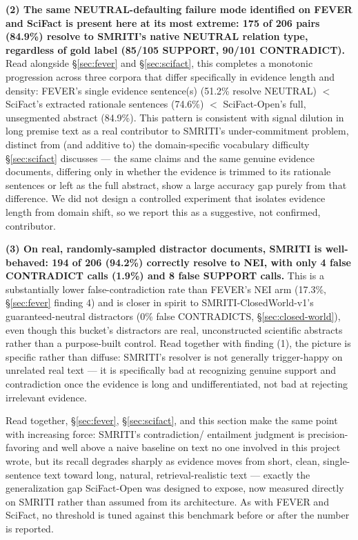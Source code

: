 \textbf{(2) The same NEUTRAL-defaulting failure mode identified on FEVER
and SciFact is present here at its most extreme: 175 of 206 pairs
(84.9\%) resolve to SMRITI's native NEUTRAL relation type, regardless of
gold label (85/105 SUPPORT, 90/101 CONTRADICT).} Read alongside
\S\ref{sec:fever} and \S\ref{sec:scifact}, this completes a monotonic
progression across three corpora that differ specifically in evidence
length and density: FEVER's single evidence sentence(s) (51.2\% resolve
NEUTRAL) $<$ SciFact's extracted rationale sentences (74.6\%) $<$
SciFact-Open's full, unsegmented abstract (84.9\%). This pattern is
consistent with signal dilution in long premise text as a real
contributor to SMRITI's under-commitment problem, distinct from (and
additive to) the domain-specific vocabulary difficulty \S\ref{sec:scifact}
discusses --- the same claims and the same genuine evidence documents,
differing only in whether the evidence is trimmed to its rationale
sentences or left as the full abstract, show a large accuracy gap
purely from that difference. We did not design a controlled experiment
that isolates evidence length from domain shift, so we report this as a
suggestive, not confirmed, contributor.

\textbf{(3) On real, randomly-sampled distractor documents, SMRITI is
well-behaved: 194 of 206 (94.2\%) correctly resolve to NEI, with only 4
false CONTRADICT calls (1.9\%) and 8 false SUPPORT calls.} This is a
substantially lower false-contradiction rate than FEVER's NEI arm
(17.3\%, \S\ref{sec:fever} finding 4) and is closer in spirit to
SMRITI-ClosedWorld-v1's guaranteed-neutral distractors (0\% false
CONTRADICTS, \S\ref{sec:closed-world}), even though this bucket's
distractors are real, unconstructed scientific abstracts rather than a
purpose-built control. Read together with finding (1), the picture is
specific rather than diffuse: SMRITI's resolver is not generally
trigger-happy on unrelated real text --- it is specifically bad at
recognizing genuine support and contradiction once the evidence is long
and undifferentiated, not bad at rejecting irrelevant evidence.

Read together, \S\ref{sec:fever}, \S\ref{sec:scifact}, and this section
make the same point with increasing force: SMRITI's contradiction/
entailment judgment is precision-favoring and well above a naive
baseline on text no one involved in this project wrote, but its recall
degrades sharply as evidence moves from short, clean, single-sentence
text toward long, natural, retrieval-realistic text --- exactly the
generalization gap SciFact-Open was designed to expose, now measured
directly on SMRITI rather than assumed from its architecture. As with
FEVER and SciFact, no threshold is tuned against this benchmark before
or after the number is reported.
